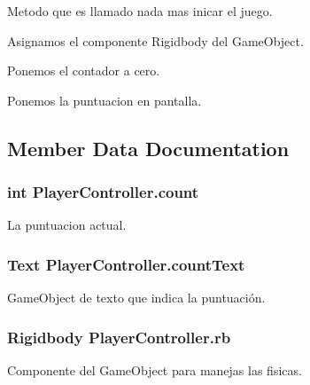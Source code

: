 Metodo que es llamado nada mas inicar el juego. 

Asignamos el componente Rigidbody del Game\+Object.

Ponemos el contador a cero.

Ponemos la puntuacion en pantalla. 

\subsection{Member Data Documentation}
\hypertarget{class_player_controller_ac44590ddcba0af5af97eb025a56f9ae5}{}
\subsubsection[{count}]{\setlength{\rightskip}{0pt plus 5cm}int Player\+Controller.\+count\hspace{0.3cm}{\ttfamily [private]}}\label{class_player_controller_ac44590ddcba0af5af97eb025a56f9ae5}


La puntuacion actual. 

\hypertarget{class_player_controller_a61795bee5f0ca4705f688419919e3086}{}
\subsubsection[{count\+Text}]{\setlength{\rightskip}{0pt plus 5cm}Text Player\+Controller.\+count\+Text}\label{class_player_controller_a61795bee5f0ca4705f688419919e3086}


Game\+Object de texto que indica la puntuación. 

\hypertarget{class_player_controller_a93b9fa76e5456725594e87dd40f93611}{}
\subsubsection[{rb}]{\setlength{\rightskip}{0pt plus 5cm}Rigidbody Player\+Controller.\+rb\hspace{0.3cm}{\ttfamily [private]}}\label{class_player_controller_a93b9fa76e5456725594e87dd40f93611}


Componente del Game\+Object para manejas las fisicas. 

